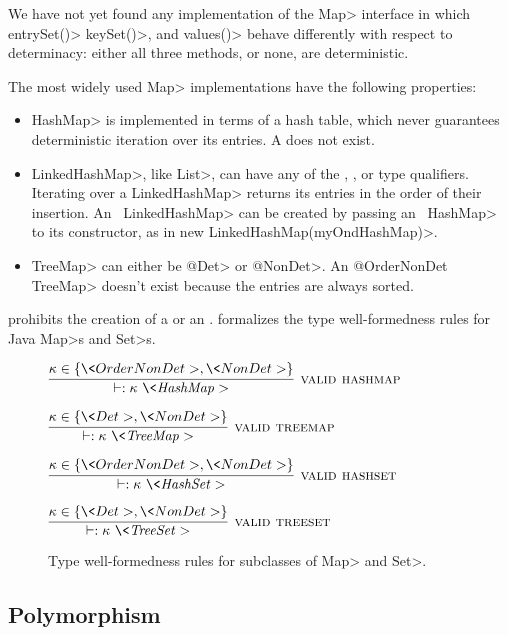 We have not yet found any implementation of the \<Map>
interface in which \<entrySet()> \<keySet()>, and \<values()> behave
differently with respect to determinacy:  either all three methods, or none, are deterministic.

The most widely used \<Map> implementations have the following properties:
\begin{itemize}
    \item \<HashMap> is implemented in terms of a hash table, which never
      guarantees deterministic iteration over its entries. A  does not exist.
    \item \<LinkedHashMap>, like \<List>, can have any of the \aNonDet,
      \aOrderNonDet, or \aDet type qualifiers. Iterating over a
      \<LinkedHashMap> returns
    its entries in the order of their insertion. An \aOrderNonDet\
    \<LinkedHashMap> can be created by passing an
    \aOrderNonDet\ \<HashMap> to its constructor, as in \<new
    LinkedHashMap(myOndHashMap)>.
    \item \<TreeMap> can either be \<@Det> or \<@NonDet>. An \<@OrderNonDet
      TreeMap> doesn't exist because the entries are always sorted.
\end{itemize}

\noindent
\TheDeterminismChecker prohibits the creation of a  or an .
\Cref{fig-creation-rules} formalizes the type well-formedness rules for
Java \<Map>s and \<Set>s.

\begin{figure}
    $\infer[\rulename{valid hashmap}]{\vdash: \|\kappa\ \<HashMap>|}{\kappa \in \{ \<OrderNonDet>, \<NonDet> \}}$
    
    \bigskip
    
    $\infer[\rulename{valid treemap}]{\vdash: \|\kappa\ \<TreeMap>|}{\kappa \in \{ \<Det>, \<NonDet> \}}$
    
    \bigskip
    
    $\infer[\rulename{valid hashset}]{\vdash: \|\kappa\ \<HashSet>|}{\kappa \in \{ \<OrderNonDet>, \<NonDet> \}}$
    
    \bigskip
    
    $\infer[\rulename{valid treeset}]{\vdash: \|\kappa\ \<TreeSet>|}{\kappa \in \{ \<Det>, \<NonDet> \}}$
    \caption{Type well-formedness rules for subclasses of \<Map> and \<Set>.}
    \label{fig-creation-rules}
\end{figure}


\subsection{Polymorphism}\label{java-polymorphism}


